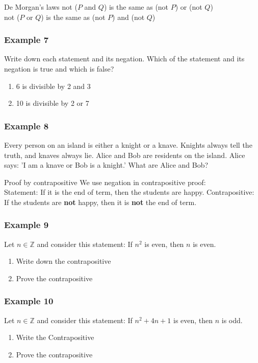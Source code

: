 \documentclass{beamer}
\begin{document}
\begin{frame}{De Morgan's laws}
    not ($P$ and $Q$) is the same as (not $P$) or (not $Q$)\\
    not ($P$ or $Q$) is the same as (not $P$) and (not $Q$)
\end{frame}

\begin{frame}[t]
    \frametitle{Example 7}
    Write down each statement and its negation. Which of the statement and its negation is
    true and which is false?\\
    \begin{enumerate}
        \item 6 is divisible by 2 and 3
        \item 10 is divisible by 2 or 7
    \end{enumerate}
\end{frame}

\begin{frame}[t]
    \frametitle{Example 8}
    Every person on an island is either a knight or a knave. Knights always tell the truth, and
 knaves always lie. Alice and Bob are residents on the island. Alice says: 'I am a knave or
 Bob is a knight.' What are Alice and Bob?
\end{frame}

\begin{frame}{Proof by contrapositive}
    We use negation in contrapositive proof:\\
    Statement: If it is the end of term, then the students are happy.
    Contrapositive: If the students are \textbf{not} happy, then it is \textbf{not} the end of term.
\end{frame}

\begin{frame}[t]
    \frametitle{Example 9}
    Let $n \in \mathbb{Z}$ and consider this statement: If $n^2$ is even, then $n$ is even.\\
    \begin{enumerate}
        \item Write down the contrapositive
        \item Prove the contrapositive
    \end{enumerate}
\end{frame}

\begin{frame}[t]
    \frametitle{Example 10}
    Let $n \in \mathbb{Z}$ and consider this statement: If $n^2 + 4n + 1$ is even, then $n$ is odd.\\
    \begin{enumerate}
        \item Write the Contrapositive
        \item Prove the contrapositive
    \end{enumerate}
\end{frame}
\end{document}
